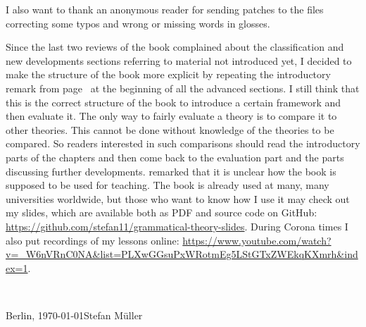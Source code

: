 I also want to thank an anonymous reader for sending patches to the \latex files correcting some
typos and wrong or missing words in glosses.

Since the last two reviews of the book complained about the classification and new developments
sections referring to material not introduced yet, I decided to make the structure of the book more
explicit by repeating the introductory remark from page~\pageref{page:structure-of-book} at the
beginning of all the advanced sections. I still think that this is the correct structure of the book to introduce a
certain framework and then evaluate it. The only way to fairly evaluate a theory is to compare it to
other theories. This cannot be done without knowledge of the theories to be compared. So readers
interested in such comparisons should read the introductory parts of the chapters and then come back
to the evaluation part and the parts discussing further developments. \citet{Culicover2021a}
remarked that it is unclear how the book is supposed to be used for teaching. The book is already
used at many, many universities worldwide, but those who want to know how I use it may check out my
slides, which are available both as PDF and source code on GitHub:
\url{https://github.com/stefan11/grammatical-theory-slides}. During Corona times I also put
recordings of my lessons online: \url{https://www.youtube.com/watch?v=_W6nVRnC0NA&list=PLXwGGsuPxWRotmEg5LStGTxZWEkqKXmrh&index=1}.

~\medskip

\noindent
Berlin, \today\hfill Stefan Müller



